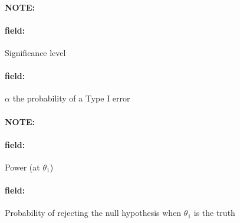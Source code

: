 \documentclass[12pt]{article}
\newenvironment{note}{\paragraph{NOTE:}}{}
\newenvironment{field}{\paragraph{field:}}{}
\begin{document}
\begin{note}
    \begin{field}
        Significance level
    \end{field}
    \begin{field}
        $\alpha$ the probability of a Type I error
    \end{field}
\end{note}

\begin{note}
    \begin{field}
        Power (at $\theta_1$)
    \end{field}
    \begin{field}
        Probability of rejecting the null hypothesis when $\theta_1$ is the truth
    \end{field}
\end{note}
\end{document}
